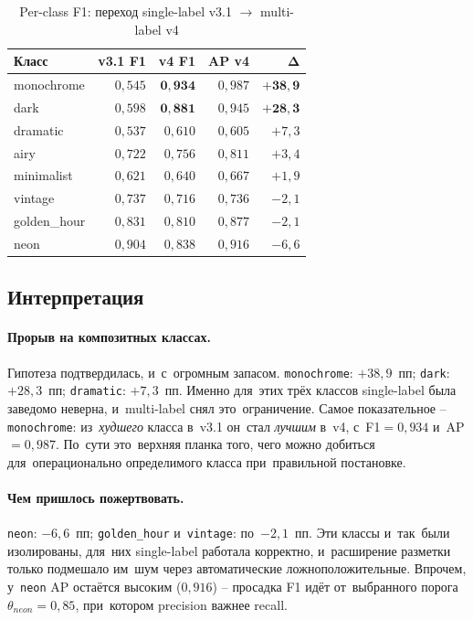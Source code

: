 \documentclass[a4paper,12pt]{diplom}
\begin{document}
\begin{table}[!ht]
\caption{Per-class F1: переход single-label v3.1 $\to$ multi-label v4}
\label{tab:ml_perclass}
\centering
\begin{tabular}{lrrrr}
\toprule
\textbf{Класс} & \textbf{v3.1 F1} & \textbf{v4 F1} & \textbf{AP v4} & $\boldsymbol{\Delta}$ \\
\midrule
monochrome   & $0{,}545$ & $\mathbf{0{,}934}$ & $0{,}987$ & $\mathbf{+38{,}9}$ \\
dark         & $0{,}598$ & $\mathbf{0{,}881}$ & $0{,}945$ & $\mathbf{+28{,}3}$ \\
dramatic     & $0{,}537$ & $0{,}610$           & $0{,}605$ & $+7{,}3$ \\
airy         & $0{,}722$ & $0{,}756$           & $0{,}811$ & $+3{,}4$ \\
minimalist   & $0{,}621$ & $0{,}640$           & $0{,}667$ & $+1{,}9$ \\
vintage      & $0{,}737$ & $0{,}716$           & $0{,}736$ & $-2{,}1$ \\
golden\_hour & $0{,}831$ & $0{,}810$           & $0{,}877$ & $-2{,}1$ \\
neon         & $0{,}904$ & $0{,}838$           & $0{,}916$ & $-6{,}6$ \\
\bottomrule
\end{tabular}
\end{table}

\subsection{Интерпретация}

\paragraph{Прорыв на композитных классах.} Гипотеза подтвердилась, и~с~огромным запасом. \texttt{monochrome}: $+38{,}9$~пп; \texttt{dark}: $+28{,}3$~пп; \texttt{dramatic}: $+7{,}3$~пп. Именно для~этих трёх классов single-label была заведомо неверна, и~multi-label снял это~ограничение. Самое показательное -- \texttt{monochrome}: из~\emph{худшего} класса в~v3.1 он~стал \emph{лучшим} в~v4, с~F1$=0{,}934$ и~AP$=0{,}987$. По~сути это~верхняя планка того, чего можно добиться для~операционально определимого класса при~правильной постановке.

\paragraph{Чем пришлось пожертвовать.} \texttt{neon}: $-6{,}6$~пп; \texttt{golden\_hour} и~\texttt{vintage}: по~$-2{,}1$~пп. Эти классы и~так~были изолированы, для~них single-label работала корректно, и~расширение разметки только подмешало им~шум через автоматические ложноположительные. Впрочем, у~\texttt{neon} AP остаётся высоким ($0{,}916$) -- просадка F1 идёт от~выбранного порога $\theta_{neon}=0{,}85$, при~котором precision важнее recall.
\end{document}
